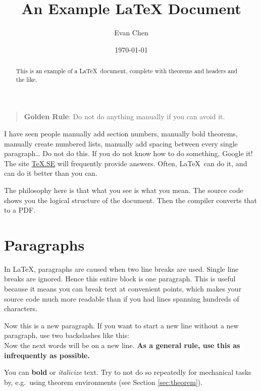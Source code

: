 \documentclass[11pt]{scrartcl}
\theoremstyle{plain} %
\theoremstyle{definition}
\theoremstyle{remark}
\begin{document}
\title{An Example LaTeX Document}
\author{Evan Chen}
\date{\today}
\maketitle

\begin{abstract}
  This is an example of a \LaTeX\ document,
  complete with theorems and headers and the like.
\end{abstract}

\tableofcontents

\eject

\begin{quote}
  \textbf{Golden Rule}: Do not do anything manually if you can avoid it.
\end{quote}

I have seen people manually add section numbers, manually bold theorems,
manually create numbered lists, manually add spacing
between every single paragraph\dots
Do not do this. If you do not know how to do something, Google it!
The site \href{http://tex.stackexchange.com}{TeX.SE} will frequently provide answers.
Often, \LaTeX\ can do it, and can do it better than you can.

The philosophy here is that what you see is what you mean.
The source code shows you the logical structure of the document.
Then the compiler converts that to a PDF.

\section{Paragraphs}
In \LaTeX, paragraphs are caused when two line breaks are used.
Single line breaks are ignored.
Hence this entire block is one paragraph.
This is useful because it means you can break text at convenient points,
which makes your source code much more readable than
if you had lines spanning hundreds of characters.

Now this is a new paragraph. If you want to
start a new line without a new paragraph, use
two backslashes like this:
\\
Now the next words will be on a new line.
\textbf{As a general rule, use this as infrequently as possible.}

You can \textbf{bold} or \textit{italicize} text.
Try to not do so repeatedly for mechanical tasks by,
e.g.\ using theorem environments (see Section \ref{sec:theorem}).
\end{document}
